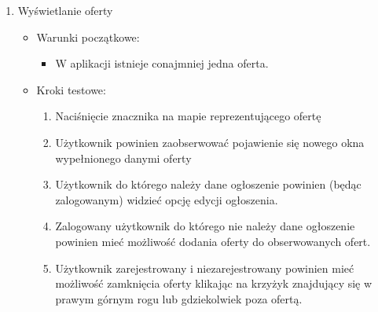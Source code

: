 \begin{enumerate}
 \item Wyświetlanie oferty
  \begin{itemize}
   \item Warunki początkowe:
    \begin{itemize}
     \item W aplikacji istnieje conajmniej jedna oferta.
    \end{itemize}
   \item Kroki testowe:
    \begin{enumerate}
     \item Naciśnięcie znacznika na mapie reprezentującego ofertę
     \item Użytkownik powinien zaobserwować pojawienie się nowego okna wypełnionego danymi oferty
     \item Użytkownik do którego należy dane ogłoszenie powinien (będąc zalogowanym) widzieć opcję edycji ogłoszenia.
     \item Zalogowany użytkownik do którego nie należy dane ogłoszenie powinien mieć możliwość dodania oferty do obserwowanych ofert.
     \item Użytkownik zarejestrowany i niezarejestrowany powinien mieć możliwość zamknięcia oferty klikając na krzyżyk znajdujący się w prawym górnym rogu lub gdziekolwiek poza ofertą.
    \end{enumerate}
  \end{itemize} 


\end{enumerate}
